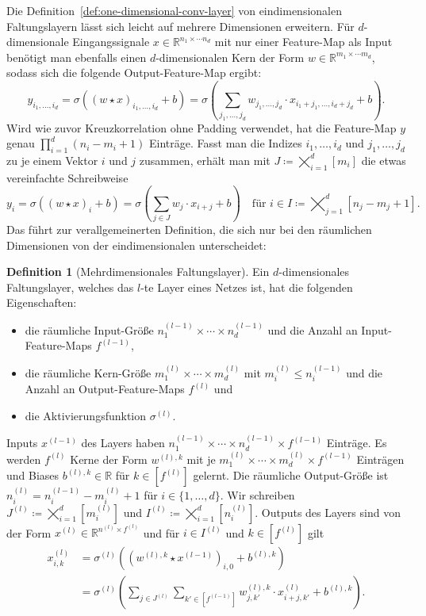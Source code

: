 \documentclass[paper=a4, 	%
		fontsize=11pt,
		abstract=true, 	%
		headsepline, 	%
		notitlepage	%
		]{scrartcl}
\theoremstyle{definition}
\newtheorem{definition}[theorem]{Definition}
\newcommand{\R}{\mathbb{R}}
\newcommand{\fNat}[1]{[ #1 ]}
\begin{document}
Die Definition~\ref{def:one-dimensional-conv-layer} von eindimensionalen Faltungslayern lässt sich leicht auf mehrere Dimensionen erweitern.
Für $d$-dimensionale Eingangssignale $x\in\R^{n_1\times \cdots n_d}$ mit nur einer Feature-Map als Input benötigt man ebenfalls einen $d$-dimensionalen Kern der Form $w\in\R^{m_1\times\cdots m_d}$, sodass sich die folgende Output-Feature-Map ergibt:
\[
    y_{i_1,\dots,i_d} = \sigma\left((w\star x)_{i_1,\dots,i_d} + b\right)
    = \sigma\left( \sum_{j_1,\dots,j_d} w_{j_1,\dots,j_d} \cdot x_{i_1+j_1,\dots,i_d+j_d} + b \right).
\]
Wird wie zuvor Kreuzkorrelation ohne Padding verwendet, hat die Feature-Map $y$ genau $\prod_{i=1}^d (n_i - m_i +1)$ Einträge.
Fasst man die Indizes $i_1,\dots,i_d$ und $j_1,\dots,j_d$ zu je einem Vektor $i$ und $j$ zusammen, erhält man mit $J\coloneqq \bigtimes_{i=1}^d [m_i]$ die etwas vereinfachte Schreibweise
\[
    y_{i} = \sigma\left((w\star x)_{i} + b\right)
    = \sigma\left( \sum_{j \in J} w_j \cdot x_{i+j} + b \right) \quad \text{für $i\in I\coloneqq \bigtimes_{j=1}^d [n_j - m_j +1]$}.
\]
Das führt zur verallgemeinerten Definition, die sich nur bei den räumlichen Dimensionen von der eindimensionalen unterscheidet:

\begin{definition}[Mehrdimensionales Faltungslayer]\label{def:multi-dimensional-conv-layer}
    Ein $d$-dimensionales Faltungslayer, welches das $l$-te Layer eines Netzes ist, hat die folgenden Eigenschaften:
    \begin{itemize}
        \item die räumliche Input-Größe $n^{(l-1)}_1\times\cdots\times n^{(l-1)}_d$ und die Anzahl an Input-Feature-Maps $f^{(l-1)}$,
        \item die räumliche Kern-Größe $m^{(l)}_1\times \cdots \times m^{(l)}_d$ mit $m^{(l)}_i \leq n^{(l-1)}_i$ und die Anzahl an Output-Feature-Maps $f^{(l)}$ und
        \item die Aktivierungsfunktion $\sigma^{(l)}$.
    \end{itemize}
    Inputs $x^{(l-1)}$ des Layers haben $n^{(l-1)}_1\times\cdots\times n^{(l-1)}_d \times f^{(l-1)}$ Einträge.
    Es werden $f^{(l)}$ Kerne der Form $w^{(l),k}$ mit je $m^{(l)}_1\times\cdots\times m^{(l)}_d \times f^{(l-1)}$ Einträgen und Biases $b^{(l),k}\in\R$ für  $k\in \fNat{f^{(l)}}$ gelernt.
    Die räumliche Output-Größe ist $n^{(l)}_i = n^{(l-1)}_i-  m^{(l)}_i + 1$ für $i\in\{1,\dots, d\}$.
    Wir schreiben $J^{(l)} \coloneqq \bigtimes_{i=1}^d [m^{(l)}_i]$ und $I^{(l)} \coloneqq \bigtimes_{i=1}^d [n^{(l)}_i]$.
    Outputs des Layers sind von der Form $x^{(l)}\in \R^{n^{(l)}\times f^{(l)}}$ und für $i\in I^{(l)}$ und $k\in\fNat{f^{(l)}}$ gilt
    \begin{align*}
        x^{(l)}_{i,k}
        &=  \sigma^{(l)}\left( (w^{(l),k} \star x^{(l-1)})_{i,0} + b^{(l),k} \right)\\
        &= \sigma^{(l)} \left( 
            \sum_{j \in J^{(l)}} \sum_{k'\in \fNat{f^{(l-1)}}}
            w^{(l),k}_{j,k'} \cdot x^{(l)}_{i+j, k'} + b^{(l), k}
        \right).
    \end{align*}
\end{definition}
\end{document}
